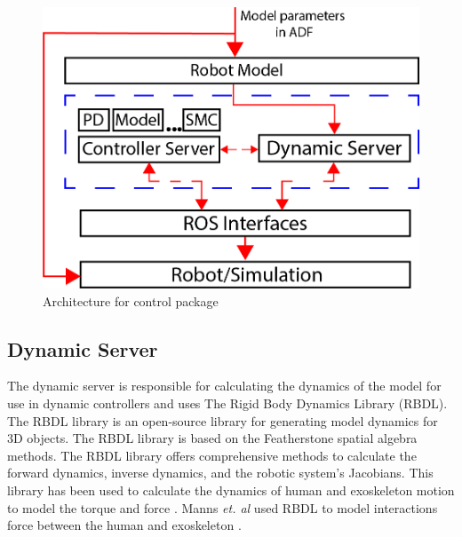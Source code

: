  

 \begin{figure}
     \centering
     \includegraphics[scale=1.5]{images/software/dynamic_server_daigram.png}
     \caption[Controller package Diagram]{Architecture for control package}
     \label{fig:ambfcontrolartecture}
 \end{figure}
 
 



 
 
 
 
 \subsection{Dynamic Server}
 The dynamic server is responsible for calculating the dynamics of the model for use in dynamic controllers and uses The Rigid Body Dynamics Library (RBDL)\cite{Felis2016}. The RBDL library is an open-source library for generating model dynamics for 3D objects. The RBDL library is based on the Featherstone spatial algebra methods. The RBDL library offers comprehensive methods to calculate the forward dynamics, inverse dynamics, and the robotic system's Jacobians. This library has been used to calculate the dynamics of human and exoskeleton motion to model the torque and force \cite{millard2017predicting} \cite{harant2017parameter}. Manns \textit{et. al} used RBDL to model interactions force between the human and exoskeleton \cite{manns2017motion}. 
 
